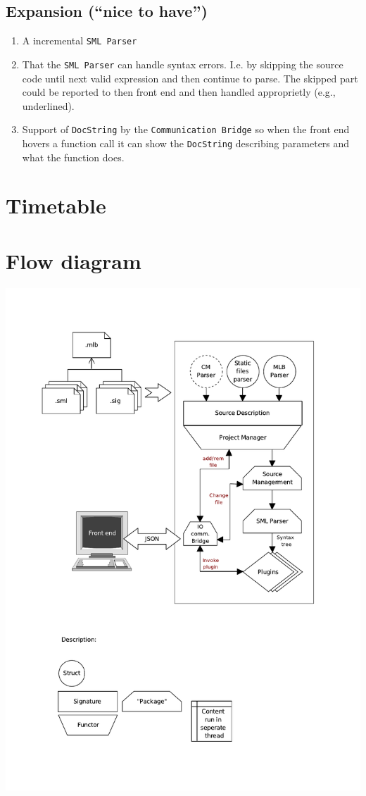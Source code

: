 \documentclass[a4paper,oneside]{memoir}
\begin{document}
\section{Expansion (``nice to have'')}


\begin{enumerate}
\item A incremental \texttt{SML Parser}

\item That the \texttt{SML Parser} can handle syntax errors. I.e. by skipping
  the source code until next valid expression and then continue to parse. The
  skipped part could be reported to then front end and then handled approprietly
  (e.g., underlined).

\item Support of \texttt{DocString} by the \texttt{Communication Bridge} so when
  the front end hovers a function call it can show the \texttt{DocString}
  describing parameters and what the function does.
\end{enumerate}


\appendix

\chapter{Timetable}


\chapter{Flow diagram}

\includegraphics[width=\textwidth-1]{../drawings/flow}



%
%
\end{document}
